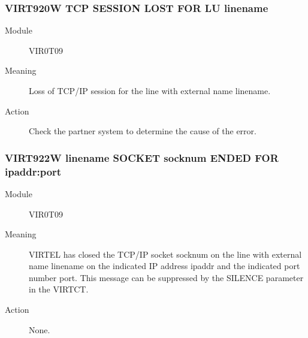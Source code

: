 \documentclass[letterpaper,10pt,english]{sphinxmanual}
\begin{document}
\subsubsection{VIRT920W TCP SESSION LOST FOR LU linename}
\label{\detokenize{messages:virt920w-tcp-session-lost-for-lu-linename}}\begin{description}
\item[{Module}] \leavevmode
VIR0T09

\item[{Meaning}] \leavevmode
Loss of TCP/IP session for the line with external name linename.

\item[{Action}] \leavevmode
Check the partner system to determine the cause of the error.

\end{description}


\subsubsection{VIRT922W linename SOCKET socknum ENDED FOR ipaddr:port}
\label{\detokenize{messages:virt922w-linename-socket-socknum-ended-for-ipaddr-port}}\begin{description}
\item[{Module}] \leavevmode
VIR0T09

\item[{Meaning}] \leavevmode
VIRTEL has closed the TCP/IP socket socknum on the line with external name linename on the indicated IP address ipaddr and the indicated port number port. This message can be suppressed by the SILENCE parameter in the VIRTCT.

\item[{Action}] \leavevmode
None.

\end{description}
\end{document}

